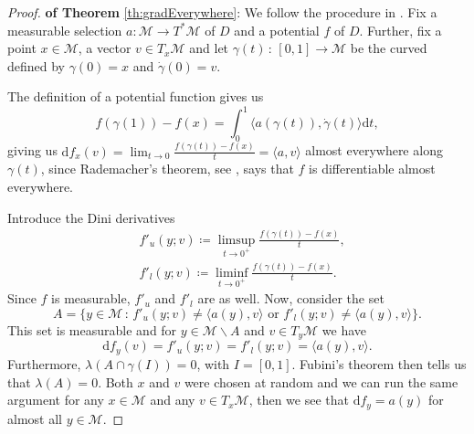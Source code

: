 \documentclass{article}
\newcommand{\CM}{\mathcal{M}}
\newcommand{\rd}{\mathrm{d}}
\begin{document}
\begin{proof}\textbf{of Theorem} \ref{th:gradEverywhere}:
    We follow the procedure in \cite{bolte2021conservative}. Fix a measurable selection $a:\CM\to T^*\CM$ of $D$ and a potential $f$ of $D$. Further, fix a point $x\in\CM$, a vector $v\in T_x\CM$ and let $\gamma(t)\,:\,[0,1]\to\CM$ be the curved defined by $\gamma(0)=x$ and $\dot\gamma(0)=v$. 

    The definition of a potential function gives us
    \begin{equation}
        f(\gamma(1))-f(x)=\int_0^1\langle a(\gamma(t)),\dot\gamma(t)\rangle\rd t,
    \end{equation}
    giving us $\rd f_x(v)=\lim_{t\to 0}\frac{f(\gamma(t))-f(x)}{t} =\langle a,v\rangle$ almost everywhere along $\gamma(t)$, since Rademacher's theorem, see \cite[Thm. 5.7]{azagra2005nonsmooth}, says that $f$ is differentiable almost everywhere. %


    Introduce the Dini derivatives \cite{ferreira2008dini}
    \begin{equation}
        \begin{aligned}
            &f'_u(y;v)\coloneqq \limsup_{t\to 0^+}\frac{f(\gamma(t))-f(x)}{t},\\
            &f'_l(y;v)\coloneqq \liminf_{t\to 0^+}\frac{f(\gamma(t))-f(x)}{t}.
        \end{aligned}
    \end{equation}
    Since $f$ is measurable, $f'_u$ and $f'_l$ are as well. Now, consider the set
    \begin{equation}
        A=\{y\in\CM\,:\, f'_u(y;v)\neq \langle a(y),v\rangle\text{ or } f'_l(y;v)\neq \langle a(y),v\rangle\}.
    \end{equation}
    This set is measurable and for $y\in\CM\backslash A$ and $v\in T_y\CM$ we have
    \begin{equation}
        \rd f_y(v)=f'_u(y;v)=f'_l(y;v)=\langle a(y),v\rangle.
    \end{equation}
    Furthermore, $\lambda(A\cap \gamma(I))=0$, with $I=[0,1]$. Fubini's theorem then tells us that $\lambda(A)=0$. Both $x$ and $v$ were chosen at random and we can run the same argument for any $x\in\CM$ and any $v\in T_x\CM$, then we see that $\rd f_y=a(y)$ for almost all $y\in\CM$.


\end{proof}
\end{document}
